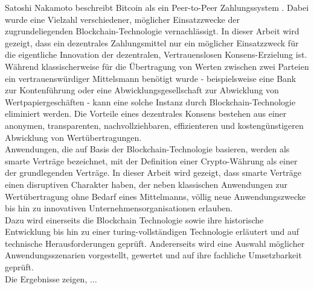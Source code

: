 \cleardoublepage
{}
\vspace{1cm}

Satoshi Nakamoto beschreibt \gls{Bitcoin} als ein Peer-to-Peer Zahlungssystem \cite{Nakamoto.31.10.2008}. Dabei wurde eine Vielzahl verschiedener, möglicher Einsatzzwecke der zugrundeliegenden Blockchain-Technologie vernachlässigt. In dieser Arbeit wird gezeigt, dass ein dezentrales Zahlungsmittel nur ein möglicher Einsatzzweck für die eigentliche Innovation der dezentralen, Vertrauenslosen Konsens-Erzielung ist. 
Während klassischerweise für die Übertragung von Werten zwischen zwei Parteien ein vertrauenswürdiger Mittelsmann benötigt wurde - beispielsweise eine Bank zur Kontenführung oder eine Abwicklungsgesellschaft zur Abwicklung von Wertpapiergeschäften - kann eine solche Instanz durch Blockchain-Technologie eliminiert werden. Die Vorteile eines dezentrales Konsens bestehen aus einer anonymen, transparenten, nachvollziehbaren, effizienteren und kostengünstigeren Abwicklung von Wertübertragungen. \\
Anwendungen, die auf Basis der Blockchain-Technologie basieren, werden als smarte Verträge bezeichnet, mit der Definition einer Crypto-Währung als einer der grundlegenden Verträge. In dieser Arbeit wird gezeigt, dass smarte Verträge einen disruptiven Charakter haben, der neben klassischen Anwendungen zur Wertübertragung ohne Bedarf eines Mittelmanns, völlig neue Anwendungszwecke bis hin zu innovativen Unternehmensorganisationen erlauben. \\
Dazu wird einerseits die Blockchain Technologie sowie ihre historische Entwicklung bis hin zu einer turing-vollständigen Technologie erläutert und auf technische Herausforderungen geprüft. Andererseits wird eine Auswahl möglicher Anwendungsszenarien vorgestellt, gewertet und auf ihre fachliche Umsetzbarkeit geprüft.\\
Die Ergebnisse zeigen, ... 
